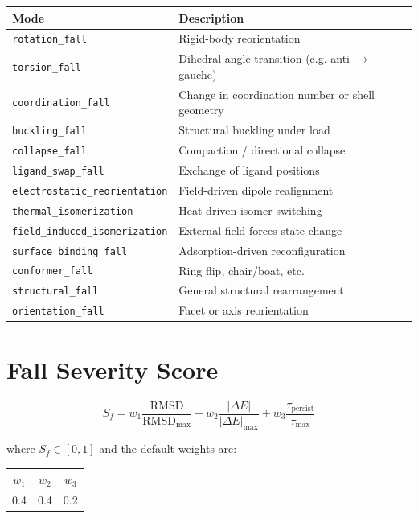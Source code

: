 \documentclass[11pt]{article}
\begin{document}
\begin{center}
\begin{tabular}{lp{8cm}}
\toprule
\textbf{Mode} & \textbf{Description} \\
\midrule
\texttt{rotation\_fall} & Rigid-body reorientation \\
\texttt{torsion\_fall} & Dihedral angle transition (e.g. anti $\to$ gauche) \\
\texttt{coordination\_fall} & Change in coordination number or shell geometry \\
\texttt{buckling\_fall} & Structural buckling under load \\
\texttt{collapse\_fall} & Compaction / directional collapse \\
\texttt{ligand\_swap\_fall} & Exchange of ligand positions \\
\texttt{electrostatic\_reorientation} & Field-driven dipole realignment \\
\texttt{thermal\_isomerization} & Heat-driven isomer switching \\
\texttt{field\_induced\_isomerization} & External field forces state change \\
\texttt{surface\_binding\_fall} & Adsorption-driven reconfiguration \\
\texttt{conformer\_fall} & Ring flip, chair/boat, etc. \\
\texttt{structural\_fall} & General structural rearrangement \\
\texttt{orientation\_fall} & Facet or axis reorientation \\
\bottomrule
\end{tabular}
\end{center}

\section{Fall Severity Score}

\begin{equation}
S_f = w_1 \frac{\text{RMSD}}{\text{RMSD}_{\max}} + w_2 \frac{|\Delta E|}{|\Delta E|_{\max}} + w_3 \frac{\tau_{\text{persist}}}{\tau_{\max}}
\end{equation}

where $S_f \in [0, 1]$ and the default weights are:
\begin{center}
\begin{tabular}{ccc}
\toprule
$w_1$ & $w_2$ & $w_3$ \\
\midrule
0.4 & 0.4 & 0.2 \\
\bottomrule
\end{tabular}
\end{center}
\end{document}
